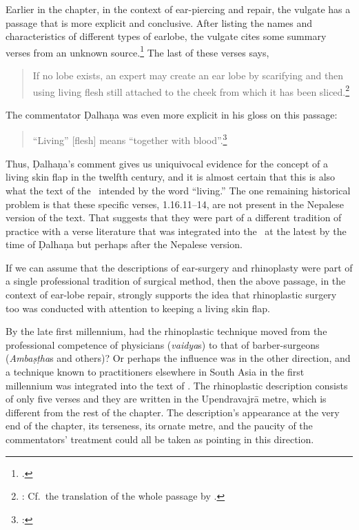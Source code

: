 Earlier in the chapter, in the context of ear-piercing and repair, the vulgate has
a passage that is more explicit and conclusive.  After listing the names and
characteristics of different types of earlobe, the vulgate cites some summary
verses from an unknown source.\footnote{.}  The last of these
    verses says,
    \begin{quote}
            If no lobe exists, an expert may create an ear lobe by scarifying and
then using living flesh still attached to the cheek from which it has
been sliced.\footnote{:  
    Cf.\ the translation of the whole passage by \citet[94]{wuja-2003}.}
    \end{quote}
The commentator Ḍalhaṇa was even more explicit in his gloss on this passage:
\begin{quote}
    “Living” [flesh] means “together with blood”.\footnote{:
    }
\end{quote}
Thus, Ḍalhaṇa's comment gives us uniquivocal evidence for the concept of a living
skin flap in the twelfth century, and it is almost certain that this is also what
the text of the \SS\ intended by the word “living.”  The one remaining historical
problem is that these specific verses, 1.16.11--14, are not present in the
Nepalese version of the text.  That suggests that they were part of a different
tradition of practice with a verse literature that was integrated into the \SS\ at the
latest by the time of Ḍalhaṇa but perhaps after the Nepalese version.

If we can assume that the descriptions of ear-surgery and rhinoplasty were part of
a single professional tradition of surgical method, then the above passage, in the
context of ear-lobe repair, strongly supports the idea that rhinoplastic surgery
too was conducted with attention to keeping a living skin flap.

By the late first millennium, had the rhinoplastic technique moved from the
professional competence of physicians (\emph{vaidya}s) to that of barber-surgeons
(\emph{Ambaṣṭha}s and others)?  Or perhaps the influence was in
the other direction, and a technique known to practitioners elsewhere in South
Asia in the first millennium was integrated into the text of \SS. The rhinoplastic
description consists of only five verses and they are written in the Upendravajrā
metre, which is different from the rest of the chapter.  The description's
appearance at the very end of the chapter, its terseness, its ornate metre, and
the paucity of the commentators' treatment could all be taken as pointing in this
direction.

